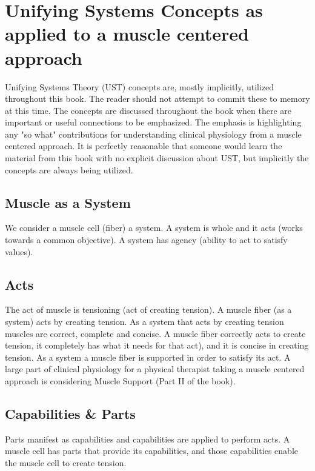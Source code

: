 \section{Unifying Systems Concepts as applied to a muscle centered approach}


Unifying Systems Theory (UST) concepts are, mostly implicitly, utilized throughout this book. The reader should not attempt to commit these to memory at this time. The concepts are discussed throughout the book when there are important or useful connections to be emphasized. The emphasis is highlighting any "so what" contributions for understanding clinical physiology from a muscle centered approach. It is perfectly reasonable that someone would learn the material from this book with no explicit discussion about UST, but implicitly the concepts are always being utilized.

\subsection{Muscle as a System}
We consider a muscle cell (fiber) a system. A system is whole and it acts (works towards a common objective). A system has agency (ability to act to satisfy values). 

\subsection{Acts}
The act of muscle is tensioning (act of creating tension). A muscle fiber (as a system) acts by creating tension. As a system that acts by creating tension muscles are correct, complete and concise. A muscle fiber correctly acts to create tension, it completely has what it needs for that act), and it is concise in creating tension. As a system a muscle fiber is supported in order to satisfy its act. A large part of clinical physiology for a physical therapist taking a muscle centered approach is considering Muscle Support (Part II of the book).

\subsection{Capabilities \& Parts}

Parts manifest as capabilities and capabilities are applied to perform acts. A muscle cell has parts that provide its capabilities, and those capabilities enable the muscle cell to create tension.

